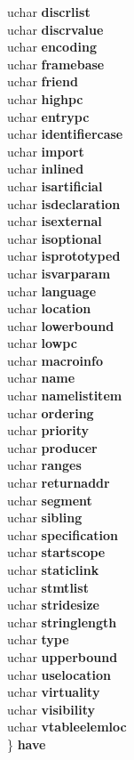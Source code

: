 \begin{DoxyCompactItemize}
\begin{tabbing}
\>uchar {\bfseries discrlist}\\
\>uchar {\bfseries discrvalue}\\
\>uchar {\bfseries encoding}\\
\>uchar {\bfseries framebase}\\
\>uchar {\bfseries friend}\\
\>uchar {\bfseries highpc}\\
\>uchar {\bfseries entrypc}\\
\>uchar {\bfseries identifiercase}\\
\>uchar {\bfseries import}\\
\>uchar {\bfseries inlined}\\
\>uchar {\bfseries isartificial}\\
\>uchar {\bfseries isdeclaration}\\
\>uchar {\bfseries isexternal}\\
\>uchar {\bfseries isoptional}\\
\>uchar {\bfseries isprototyped}\\
\>uchar {\bfseries isvarparam}\\
\>uchar {\bfseries language}\\
\>uchar {\bfseries location}\\
\>uchar {\bfseries lowerbound}\\
\>uchar {\bfseries lowpc}\\
\>uchar {\bfseries macroinfo}\\
\>uchar {\bfseries name}\\
\>uchar {\bfseries namelistitem}\\
\>uchar {\bfseries ordering}\\
\>uchar {\bfseries priority}\\
\>uchar {\bfseries producer}\\
\>uchar {\bfseries ranges}\\
\>uchar {\bfseries returnaddr}\\
\>uchar {\bfseries segment}\\
\>uchar {\bfseries sibling}\\
\>uchar {\bfseries specification}\\
\>uchar {\bfseries startscope}\\
\>uchar {\bfseries staticlink}\\
\>uchar {\bfseries stmtlist}\\
\>uchar {\bfseries stridesize}\\
\>uchar {\bfseries stringlength}\\
\>uchar {\bfseries type}\\
\>uchar {\bfseries upperbound}\\
\>uchar {\bfseries uselocation}\\
\>uchar {\bfseries virtuality}\\
\>uchar {\bfseries visibility}\\
\>uchar {\bfseries vtableelemloc}\\
\} {\bfseries have}\\


\end{tabbing}
\end{DoxyCompactItemize}
